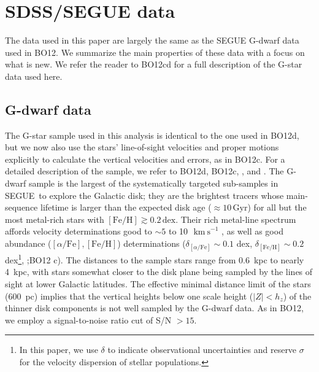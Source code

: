 \documentclass{emulateapj}
\newcommand{\segue}{SEGUE}
\newcommand{\feh}{\ensuremath{[\mathrm{Fe/H}]}}
\newcommand{\afe}{\ensuremath{[\alpha\mathrm{/Fe}]}}
\newcommand{\dex}{\ensuremath{\,\mathrm{dex}}}
\newcommand{\Gyr}{\ensuremath{\,\mathrm{Gyr}}}
\newcommand{\kms}{\ensuremath{\,\mathrm{km\ s}^{-1}}}
\newcommand{\bo}{BO12}
\begin{document}


\section{SDSS/SEGUE data}\label{sec:data}

The data used in this paper are largely the same as the SEGUE G-dwarf
data used in \bo. We summarize the main properties of these data with
a focus on what is new. We refer the reader to \bo cd for a full
description of the G-star data used here.


\subsection{G-dwarf data}\label{sec:Gdata}

The G-star sample used in this analysis is identical to the one used
in \bo d, but we now also use the stars' line-of-sight velocities and
proper motions explicitly to calculate the vertical velocities and
errors, as in \bo c.  For a detailed description of the sample, we
refer to \bo d, \bo c, \citet{Yanny09a}, and \citet{Lee11b}. The
G-dwarf sample is the largest of the systematically targeted
sub-samples in \segue\ to explore the Galactic disk; they are the
brightest tracers whose main-sequence lifetime is larger than the
expected disk age ($\approx 10\Gyr$) for all but the most metal-rich
stars with $\feh \gtrsim 0.2\dex$. Their rich metal-line spectrum
affords velocity determinations good to $\sim\!  5$ to 10~\kms
\citep{Yanny09a}, as well as good abundance ($\afe , \feh$)
determinations ($\delta_{\afe}\sim 0.1$ dex, $\delta_{\feh}\sim 0.2$
dex\footnote{In this paper, we use $\delta$ to indicate observational
  uncertainties and reserve $\sigma$ for the velocity dispersion of
  stellar populations.},
\citealt{Lee08a,Lee08b,AllendePrieto08a,Schlesinger10a,Lee11a,Smolinski11a};\bo
c). The distances to the sample stars range from $0.6$~kpc to nearly
4~kpc, with stars somewhat closer to the disk plane being sampled by
the lines of sight at lower Galactic latitudes. The effective minimal
distance limit of the stars (600~pc) implies that the vertical heights
below one scale height ($|Z| < h_z$) of the thinner disk components is
not well sampled by the G-dwarf data. As in \bo, we employ a
signal-to-noise ratio cut of S/N $> 15$.
\end{document}
